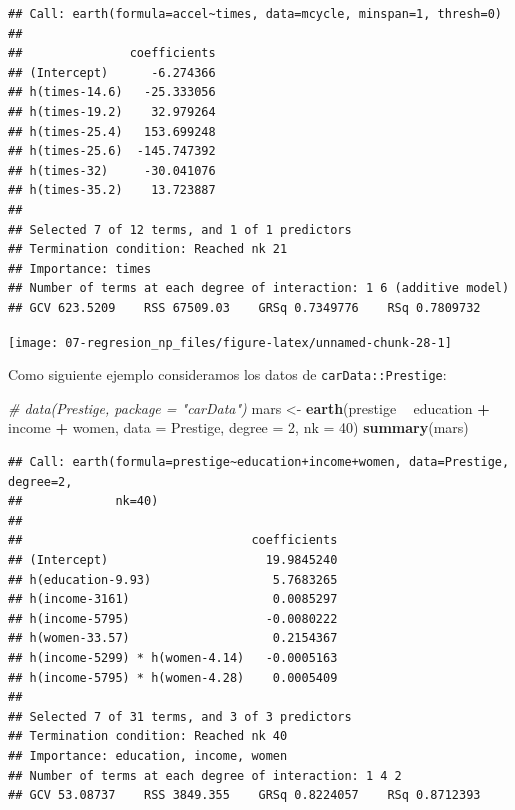 \documentclass[
  spanish,
]{book}
\newenvironment{Shaded}{\begin{snugshade}}{\end{snugshade}}
\newcommand{\CommentTok}[1]{\textcolor[rgb]{0.56,0.35,0.01}{\textit{#1}}}
\newcommand{\DataTypeTok}[1]{\textcolor[rgb]{0.13,0.29,0.53}{#1}}
\newcommand{\DecValTok}[1]{\textcolor[rgb]{0.00,0.00,0.81}{#1}}
\newcommand{\KeywordTok}[1]{\textcolor[rgb]{0.13,0.29,0.53}{\textbf{#1}}}
\newcommand{\NormalTok}[1]{#1}
\newcommand{\OperatorTok}[1]{\textcolor[rgb]{0.81,0.36,0.00}{\textbf{#1}}}
\newcommand{\StringTok}[1]{\textcolor[rgb]{0.31,0.60,0.02}{#1}}
\theoremstyle{break}
\theoremstyle{definition}
\theoremstyle{definition}
\theoremstyle{definition}
\theoremstyle{remark}
\begin{document}
\begin{verbatim}
## Call: earth(formula=accel~times, data=mcycle, minspan=1, thresh=0)
## 
##               coefficients
## (Intercept)      -6.274366
## h(times-14.6)   -25.333056
## h(times-19.2)    32.979264
## h(times-25.4)   153.699248
## h(times-25.6)  -145.747392
## h(times-32)     -30.041076
## h(times-35.2)    13.723887
## 
## Selected 7 of 12 terms, and 1 of 1 predictors
## Termination condition: Reached nk 21
## Importance: times
## Number of terms at each degree of interaction: 1 6 (additive model)
## GCV 623.5209    RSS 67509.03    GRSq 0.7349776    RSq 0.7809732
\end{verbatim}

\begin{Shaded}
\end{Shaded}

\begin{center}\texttt{[image: 07-regresion\_np\_files/figure-latex/unnamed-chunk-28-1]} \end{center}

Como siguiente ejemplo consideramos los datos de \texttt{carData::Prestige}:

\begin{Shaded}
\begin{Highlighting}[]
\CommentTok{# data(Prestige, package = "carData")}
\NormalTok{mars <-}\StringTok{ }\KeywordTok{earth}\NormalTok{(prestige }\OperatorTok{~}\StringTok{ }\NormalTok{education }\OperatorTok{+}\StringTok{ }\NormalTok{income }\OperatorTok{+}\StringTok{ }\NormalTok{women, }\DataTypeTok{data =}\NormalTok{ Prestige,}
              \DataTypeTok{degree =} \DecValTok{2}\NormalTok{, }\DataTypeTok{nk =} \DecValTok{40}\NormalTok{)}
\KeywordTok{summary}\NormalTok{(mars)}
\end{Highlighting}
\end{Shaded}

\begin{verbatim}
## Call: earth(formula=prestige~education+income+women, data=Prestige, degree=2,
##             nk=40)
## 
##                                coefficients
## (Intercept)                      19.9845240
## h(education-9.93)                 5.7683265
## h(income-3161)                    0.0085297
## h(income-5795)                   -0.0080222
## h(women-33.57)                    0.2154367
## h(income-5299) * h(women-4.14)   -0.0005163
## h(income-5795) * h(women-4.28)    0.0005409
## 
## Selected 7 of 31 terms, and 3 of 3 predictors
## Termination condition: Reached nk 40
## Importance: education, income, women
## Number of terms at each degree of interaction: 1 4 2
## GCV 53.08737    RSS 3849.355    GRSq 0.8224057    RSq 0.8712393
\end{verbatim}
\end{document}
